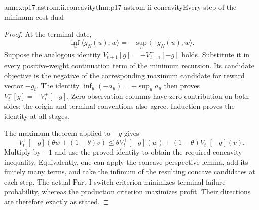 \begin{annexitem}{annex:p17.astrom.ii.concavity}{thm:p17-astrom-ii-concavity}{Every step of the minimum-cost dual}
\begin{proof}
At the terminal date,
\[
 \inf_u\langle g_N(u),w\rangle
       =-\sup_u\langle-g_N(u),w\rangle.
\]
Suppose the analogous identity
\(V_{t+1}^-[g]=-V_{t+1}^+[-g]\) holds.
Substitute it in every positive-weight continuation
term of the minimum recursion. Its candidate
objective is the negative of the corresponding
maximum candidate for reward vector \(-g_t\).
The identity \(\inf_u(-a_u)=-\sup_u a_u\)
then proves \(V_t^-[g]=-V_t^+[-g]\).
Zero observation columns have zero contribution
on both sides; the origin and terminal conventions
also agree. Induction proves the identity at
all stages.

The maximum theorem applied to \(-g\) gives
\[
 V_t^+[-g](\theta w+(1-\theta)v)
       \leq\theta V_t^+[-g](w)
                   +(1-\theta)V_t^+[-g](v).
\]
Multiply by \(-1\) and use the proved identity
to obtain the required concavity inequality.
Equivalently, one can apply the concave
perspective lemma, add its finitely many terms,
and take the infimum of the resulting concave
candidates at each step.
The actual Part I switch criterion minimizes
terminal failure probability, whereas the
production criterion maximizes profit. Their
directions are therefore exactly as stated.
\end{proof}
\end{annexitem}

